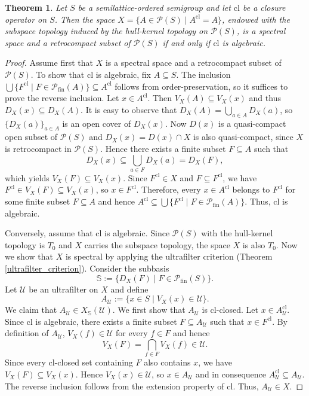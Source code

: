 \documentclass[10pt, reqno]{amsart}
\theoremstyle{plain}
\newtheorem{theorem}{Theorem}[section]
\theoremstyle{definition}
\begin{document}
\begin{theorem}\label{construction_of_spectral_space}
    Let $S$ be a semilattice-ordered semigroup and let $\mathrm{cl}$ be a closure operator on $S$. Then the space $X = \{A \in\mathcal{P}(S) \mid A^\mathrm{cl} = A\}$,
    endowed with the subspace topology induced by the hull-kernel topology on $\mathcal{P}(S)$, is a spectral space and a retrocompact subset of $\mathcal{P}(S)$ if and only if $\mathrm{cl}$ is algebraic.
\end{theorem}
\begin{proof}
    Assume first that $X$ is a spectral space and a retrocompact subset of $\mathcal{P}(S)$. To show that $\mathrm{cl}$ is algebraic, fix $A \subseteq S$. The inclusion $\bigcup\{F^\mathrm{cl} \mid F \in \mathcal{P}_\mathrm{fin}(A)\} \subseteq A^\mathrm{cl}$ follows from order-preservation, so it suffices to prove the reverse inclusion. Let $x\in A^\mathrm{cl}$. Then $V_X(A) \subseteq V_X(x)$ and thus $D_X(x) \subseteq D_X(A)$. It is easy to observe that $D_X(A) = \bigcup_{a \in A}D_X(a)$, so $\{D_X(a)\}_{a \in A}$ is an open cover of $D_X(x)$. Now $D(x)$ is a quasi-compact open subset of $\mathcal{P}(S)$ and $D_X(x) = D(x) \cap X$ is also quasi-compact, since $X$ is retrocompact in $\mathcal{P}(S)$. Hence there exists a finite subset $F \subseteq A$ such that 
    \begin{equation*}
        D_X(x) \subseteq \bigcup_{a \in F} D_X(a) = D_X(F), 
    \end{equation*}
    which yields $V_X(F) \subseteq V_X(x)$. Since $F^\mathrm{cl} \in X$ and $F \subseteq F^\mathrm{cl}$, we have $F^\mathrm{cl} \in V_X(F) \subseteq V_X(x)$, so $x \in F^\mathrm{cl}$. Therefore, every $x \in A^\mathrm{cl}$ belongs to $F^\mathrm{cl}$ for some finite subset $F \subseteq A$ and hence $A^\mathrm{cl} \subseteq \bigcup\{F^\mathrm{cl} \mid F \in \mathcal{P}_\mathrm{fin}(A)\}$. Thus, $\mathrm{cl}$ is algebraic. 
    
    Conversely, assume that $\mathrm{cl}$ is algebraic. Since $\mathcal{P}(S)$ with the hull-kernel topology is $T_0$ and $X$ carries the subspace topology, the space $X$ is also $T_0$. Now we show that $X$ is spectral by applying the ultrafilter criterion (Theorem \ref{ultrafilter_criterion}). Consider the subbasis $$\mathbb{S} := \{D_X(F) \mid F \in\mathcal{P}_\mathrm{fin}(S)\}.$$ Let $\mathscr{U}$ be an ultrafilter on $X$ and define $$A_\mathscr{U} := \{x \in S \mid V_X(x) \in \mathscr{U}\}.$$ We claim that $A_\mathscr{U} \in X_\mathbb{S}(\mathscr{U})$. We first show that $A_\mathscr{U}$ is $\mathrm{cl}$-closed. Let $x \in A_\mathscr{U}^\mathrm{cl}$. Since $\mathrm{cl}$ is algebraic, there exists a finite subset $F \subseteq A_\mathscr{U}$ such that $x \in F^\mathrm{cl}$. By definition of $A_\mathscr{U}$, $V_X(f) \in \mathscr{U}$ for every $f \in F$ and hence $$V_X(F) = \bigcap_{f \in F} V_X(f) \in \mathscr{U}.$$ Since every $\mathrm{cl}$-closed set containing $F$ also contains $x$, we have $V_X(F) \subseteq V_X(x)$. Hence $V_X(x) \in \mathscr{U}$, so $x \in A_\mathscr{U}$ and in consequence $A_\mathscr{U}^\mathrm{cl} \subseteq A_\mathscr{U}$. The reverse inclusion follows from the extension property of $\mathrm{cl}$. Thus, $A_\mathscr{U} \in X$. 
    

\end{proof}
\end{document}
